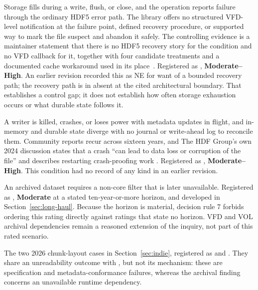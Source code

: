 \documentclass[../main.tex]{subfiles}
\begin{document}
\begin{description}[leftmargin=1.5em,style=nextline]
    \item[Storage exhaustion during write or close.]
    Storage fills during a write, flush, or close, and the operation reports
    failure through the ordinary HDF5 error path. The library offers no
    structured VFD-level notification at the failure point, defined recovery
    procedure, or supported way to mark the file suspect and abandon it safely.
    The controlling evidence is a maintainer statement that there is no HDF5
    recovery story for the condition and no VFD callback for it, together with
    four candidate treatments and a documented cache workaround used in its
    place~\cite{forum-enospc-11714}. Registered as
    , \textbf{Moderate--High}. An earlier revision recorded
    this as NE for want of a bounded recovery path; the recovery path is in
    absent at the cited architectural boundary. That establishes a control gap;
    it does not establish how often storage exhaustion occurs or what durable
    state follows it.

    \item[Corruption from abrupt termination.]
    A writer is killed, crashes, or loses power with metadata updates in
    flight, and in-memory and durable state diverge with no journal or
    write-ahead log to reconcile them. Community reports recur across sixteen
    years, and The HDF Group's own 2024 discussion states that a crash ``can
    lead to data loss or corruption of the file'' and describes restarting
    crash-proofing work
    \cite{forum-recover-1146,forum-crash-state-1598,forum-crash-prevent-2462,
    forum-flush-crash-3481,forum-flush-corrupt-4958,forum-recover-5441,
    forum-crash-corruption-7581,forum-crashproofing-12003}. Registered as
    , \textbf{Moderate--High}. This condition had no record
    of any kind in an earlier revision.

    \item[Extension-dependent loss of interpretability.]
    An archived dataset requires a non-core filter that is later unavailable.
    Registered as , \textbf{Moderate} at
    a stated ten-year-or-more horizon, and developed in
    Section~\ref{sec:long-haul}. Because the horizon is material, decision
    rule 7 forbids ordering this rating directly against ratings that state no
    horizon. VFD and VOL archival dependencies remain a reasoned extension of
    the inquiry, not part of this rated scenario.

    \item[Reader/writer disagreement.]
    The two 2026 chunk-layout cases in Section~\ref{sec:indie}, registered as
     and . They share an unreadability
    outcome with , but not its mechanism: these are
    specification and metadata-conformance failures, whereas the archival
    finding concerns an unavailable runtime dependency.
\end{description}
\end{document}
